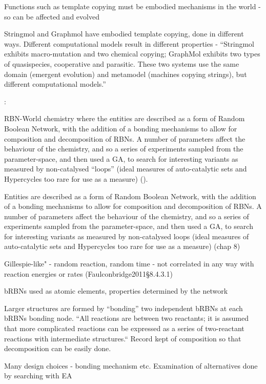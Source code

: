 			
			Functions such as template copying must be embodied mechanisms in the
			world - so can be affected and evolved

			
			Stringmol and Graphmol have embodied template copying, done in
			different ways. Different computational models result in different
			properties - ``Stringmol exhibits macro-mutation and two chemical
			copying; GraphMol exhibits two types of quasispecies, cooperative and
			parasitic. These two systems use the same domain (emergent evolution)
			and metamodel (machines copying strings), but different computational
			models.''
			

\autocite{Faulconbridge2010, Faulconbridge2011}:
		
		RBN-World \cite{Faulconbridge2011} chemistry where the entities are described as a form of Random Boolean Network, with the addition of a bonding mechanisms to allow for composition and decomposition of RBNs. A number of parameters affect the behaviour of the chemistry, and so a series of experiments sampled from the parameter-space, and then used a GA, to search for interesting variants as measured by non-catalysed ``loops'' (ideal measures of auto-catalytic sets and Hypercycles too rare for use as a measure) (\cite[§8]{Faulconbridge2011}). 

				Entities are described as a form of Random Boolean Network, with the
				addition of a bonding mechanisms to allow for composition and
				decomposition of RBNs. A number of parameters affect the behaviour
				of the chemistry, and so a series of experiments sampled from the
				parameter-space, and then used a GA, to search for interesting
				variants as measured by non-catalysed loops (ideal measures of
				auto-catalytic sets and Hypercycles too rare for use as a measure)
				(chap 8)

				
				Gillespie-like" - random reaction, random time - not correlated in
				any way with reaction energies or rates (Faulconbridge2011§8.4.3.1)

				
				bRBNs used as atomic elements, properties determined by the network
				

				Larger structures are formed by ``bonding'' two independent bRBNs at
				each bRBNs bonding node. ``All reactions are between two reactants;
				it is assumed that more complicated reactions can be expressed as a
				series of two-reactant reactions with intermediate structures.``
				Record kept of composition so that decomposition can be easily done.

				
				Many design choices - bonding mechanism etc. Examination of
				alternatives done by searching with EA
				

